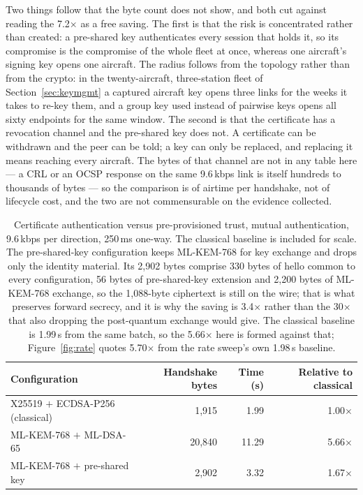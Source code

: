 \documentclass[drones,article,submit,pdftex,moreauthors]{Definitions/mdpi}
\newcommand{\kbps}{kbps}
\newcommand{\mlkem}{ML-KEM}
\newcommand{\mldsa}{ML-DSA}
\begin{document}
Two things follow that the byte count does not show, and both cut against
reading the 7.2$\times$ as a free saving. The first is that the risk is
concentrated rather than created: a pre-shared key authenticates every
session that holds it, so its compromise is the compromise of the whole
fleet at once, whereas one aircraft's signing key opens one aircraft.
The radius follows from the topology rather than from the crypto: in the
twenty-aircraft, three-station fleet of Section~\ref{sec:keymgmt} a
captured aircraft key opens three links for the weeks it takes to re-key
them, and a group key used instead of pairwise keys opens all sixty
endpoints for the same window. The
second is that the certificate has a revocation channel and the
pre-shared key does not. A certificate can be withdrawn and the peer can
be told; a key can only be replaced, and replacing it means reaching every
aircraft. The bytes of that channel are not in any table here --- a CRL or
an OCSP response on the same 9.6\,\kbps{} link is itself hundreds to
thousands of bytes --- so the comparison is of airtime per handshake, not
of lifecycle cost, and the two are not commensurable on the evidence
collected.

\begin{table}[H]
\caption{Certificate authentication versus pre-provisioned trust, mutual
authentication, 9.6\,\kbps{} per direction, 250\,ms one-way. The
classical baseline is included for scale. The pre-shared-key
configuration keeps \mlkem{}-768 for key exchange and drops only the
identity material. Its 2{,}902 bytes comprise 330 bytes of hello common
to every configuration, 56 bytes of pre-shared-key extension and
2{,}200 bytes of \mlkem{}-768 exchange, so the 1{,}088-byte ciphertext
is still on the wire; that is what preserves forward secrecy, and it is
why the saving is 3.4$\times$ rather than the 30$\times$ that also
dropping the post-quantum exchange would give. The classical baseline
is 1.99\,s from the same batch, so the 5.66$\times$ here is formed
against that; Figure~\ref{fig:rate} quotes 5.70$\times$ from the rate
sweep's own 1.98\,s baseline.}
\label{tab:psk}
\centering
\begin{tabular}{lrrr}
\toprule
Configuration & Handshake bytes & Time (s) & Relative to classical \\
\midrule
X25519 $+$ ECDSA-P256 (classical) & 1{,}915 & 1.99 & 1.00$\times$ \\
\mlkem{}-768 $+$ \mldsa{}-65       & 20{,}840 & 11.29 & 5.66$\times$ \\
\mlkem{}-768 $+$ pre-shared key    & 2{,}902 & 3.32 & 1.67$\times$ \\
\bottomrule
\end{tabular}
\end{table}
\end{document}
